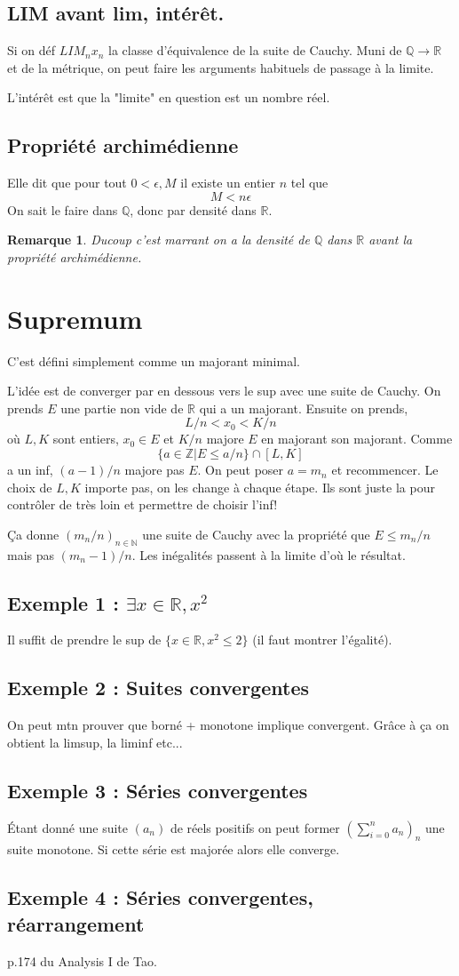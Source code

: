 \documentclass[a4paper,12pt]{book}
\newcommand{\Z}{\mathbb{Z}}
\newcommand{\R}{\mathbb{R}}
\newcommand{\Q}{\mathbb{Q}}
\newcommand{\N}{\mathbb{N}}
\theoremstyle{plain}
\newtheorem{rem}{Remarque}
\theoremstyle{definition}
\theoremstyle{remark}
\begin{document}
\subsection{LIM avant lim, intérêt.}
Si on déf $LIM_n x_n$ la classe d'équivalence de la suite de Cauchy. Muni de
$\Q\to \R$ et de la métrique, on peut faire les arguments habituels de passage
à la limite.

L'intérêt est que la "limite" en question est un nombre réel.

\subsection{Propriété archimédienne}
Elle dit que pour tout $0<\epsilon, M$ il existe un entier $n$ tel que 
\[M<n\epsilon\]
On sait le faire dans $\Q$, donc par densité dans $\R$.

\begin{rem}
		Ducoup c'est marrant on a la densité de $\Q$ dans $\R$ avant la propriété
		archimédienne.
\end{rem}

\section{Supremum}
C'est défini simplement comme un majorant minimal.

L'idée est de converger par en dessous vers le sup avec une suite de Cauchy. On
prends $E$ une partie non vide de $\R$ qui a un majorant. Ensuite on prends,
\[L/n<x_0<K/n\]
où $L,K$ sont entiers, $x_0\in E$ et $K/n$ majore $E$ en majorant son majorant. 
Comme 
\[\{a\in  \Z|E\leq a/n\}\cap [L,K]\]
a un inf, $(a-1)/n$ majore pas $E$. On peut poser $a=m_n$ et recommencer. Le choix
de $L,K$ importe pas, on les change à chaque étape. Ils sont juste la pour contrôler
de très loin et permettre de choisir l'inf!

Ça donne $(m_n/n)_{n\in \N}$ une suite de Cauchy avec la propriété que
$E\leq m_n/n$ mais pas $(m_n-1)/n$. Les inégalités passent à la limite d'où 
le résultat.

\subsection{Exemple 1 : $\exists x\in\R, x^2$}
Il suffit de prendre le sup de $\{x\in \R, x^2\leq 2\}$ (il faut montrer l'égalité).

\subsection{Exemple 2 : Suites convergentes}
On peut mtn prouver que borné + monotone implique convergent. Grâce à ça on obtient
la limsup, la liminf etc...

\subsection{Exemple 3 : Séries convergentes}
Étant donné une suite $(a_n)$ de réels positifs on peut former $(\sum_{i=0}^n a_n)_n$
une suite monotone. Si cette série est majorée alors elle converge. 

\subsection{Exemple 4 : Séries convergentes, réarrangement}
p.174 du Analysis I de Tao.
\end{document}

